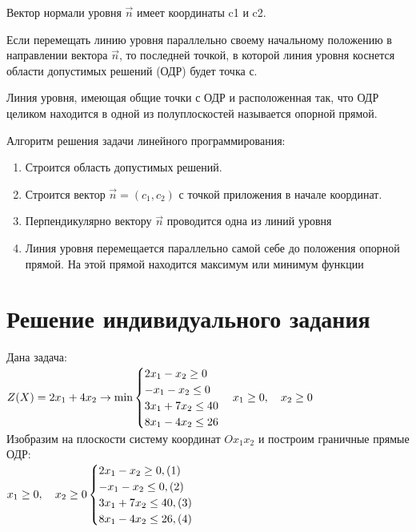 \documentclass[a4paper, 12pt]{article}
\begin{document}
Вектор нормали уровня $\vec{n}$ имеет координаты c1 и c2.

Если перемещать линию уровня параллельно своему начальному положению в направлении вектора $\vec{n}$, то последней точкой, в которой линия уровня коснется области допустимых решений (ОДР) будет точка с.

Линия уровня, имеющая общие точки с ОДР и расположенная так, что ОДР целиком находится в одной из полуплоскостей называется опорной прямой.

Алгоритм решения задачи линейного программирования:
\begin{enumerate}
	\item Строится область допустимых решений.
	\item Строится вектор $\vec{n}= (c_1, c_2)$ с точкой приложения в начале координат.
	\item Перпендикулярно вектору $\vec{n}$ проводится одна из линий уровня
	\item Линия уровня перемещается параллельно самой себе до положения опорной прямой. На этой прямой находится максимум или минимум функции
\end{enumerate}

\section{Решение индивидуального задания}
Дана задача:\\

\begin{math}
  Z(X)=2x_1+4x_2 \rightarrow  \text{min} \\
  \begin{cases}
    2x_1-x_2 \geq 0\\
    -x_1-x_2 \leq 0\\
    3x_1+7x_2 \leq 40\\
    8x_1-4x_2 \leq 26\\
  \end{cases}\\
  x_1\geq 0, \quad x_2\geq 0
\end{math}\\

Изобразим на плоскости систему координат $Ox_1x_2$ и построим граничные прямые ОДР:\\

\begin{math}
  x_1\geq 0, \quad x_2\geq 0\\
  \begin{cases}
    2x_1-x_2 \geq 0,(1)\\
    -x_1-x_2 \leq 0,(2)\\
    3x_1+7x_2 \leq 40,(3)\\
    8x_1-4x_2 \leq 26,(4)\\
  \end{cases}\\
\end{math}\\
\end{document}
